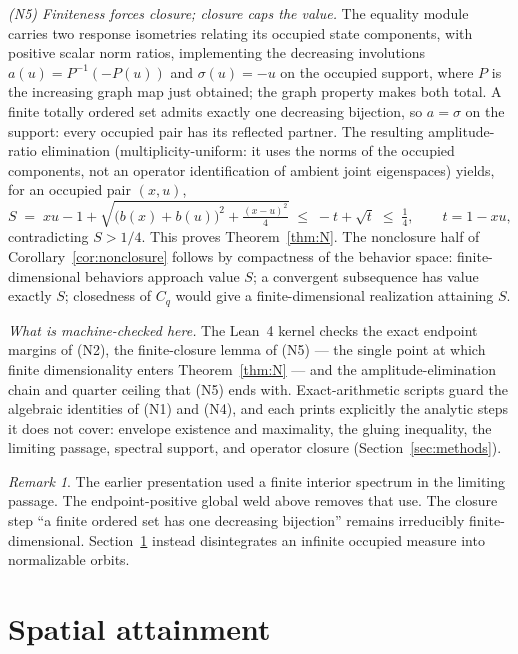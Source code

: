 \documentclass[11pt]{article}
\theoremstyle{remark}
\newtheorem{remark}[theorem]{Remark}
\newcommand{\Cq}{C_q}
\begin{document}
\emph{(N5) Finiteness forces closure; closure caps the value.} The equality
module carries two response isometries relating its occupied state
components, with positive scalar norm ratios, implementing the decreasing
involutions $a(u)=P^{-1}(-P(u))$ and $\sigma(u)=-u$ on the occupied support,
where $P$ is the increasing graph map just obtained; the
graph property makes both total. A finite totally ordered set admits exactly
one decreasing bijection, so $a=\sigma$ on the support: every occupied pair has
its reflected partner. The resulting amplitude-ratio elimination
(multiplicity-uniform: it uses the norms of the occupied components,
not an operator identification of ambient joint eigenspaces) yields,
for an occupied pair $(x,u)$,
\[
S \;=\; xu-1+\sqrt{\bigl(b(x)+b(u)\bigr)^2+\tfrac{(x-u)^2}{4}}
\;\le\; -t+\sqrt{t}\;\le\;\tfrac14,\qquad t=1-xu,
\]
contradicting $S>1/4$. This proves Theorem~\ref{thm:N}. The nonclosure half
of Corollary~\ref{cor:nonclosure} follows by compactness of the behavior
space: finite-dimensional behaviors approach value $S$; a convergent
subsequence has value exactly $S$; closedness of $\Cq$ would give a
finite-dimensional realization attaining $S$.

\emph{What is machine-checked here.} The Lean~4 kernel checks the exact
endpoint margins of (N2), the finite-closure lemma of (N5) --- the single
point at which finite dimensionality enters Theorem~\ref{thm:N} --- and the
amplitude-elimination chain and quarter ceiling that (N5) ends with.
Exact-arithmetic scripts guard the algebraic identities of (N1) and (N4),
and each prints explicitly the analytic steps it does not cover: envelope
existence and maximality, the gluing inequality, the limiting passage,
spectral support, and operator closure (Section~\ref{sec:methods}).

\begin{remark}\label{rem:twice}
The earlier presentation used a finite interior spectrum in the limiting
passage. The endpoint-positive global weld above removes that use.
The closure step ``a finite ordered set has one decreasing bijection''
remains irreducibly finite-dimensional. Section~\ref{sec:S} instead
disintegrates an infinite occupied measure into normalizable orbits.
\end{remark}

\section{Spatial attainment}\label{sec:S}
\end{document}
